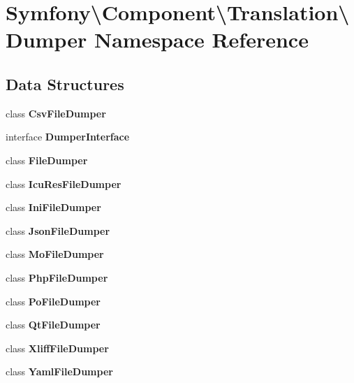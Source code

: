 \section{Symfony\textbackslash{}Component\textbackslash{}Translation\textbackslash{}Dumper Namespace Reference}
\label{namespace_symfony_1_1_component_1_1_translation_1_1_dumper}
\subsection*{Data Structures}
\begin{DoxyCompactItemize}
\item 
class {\bf Csv\+File\+Dumper}
\item 
interface {\bf Dumper\+Interface}
\item 
class {\bf File\+Dumper}
\item 
class {\bf Icu\+Res\+File\+Dumper}
\item 
class {\bf Ini\+File\+Dumper}
\item 
class {\bf Json\+File\+Dumper}
\item 
class {\bf Mo\+File\+Dumper}
\item 
class {\bf Php\+File\+Dumper}
\item 
class {\bf Po\+File\+Dumper}
\item 
class {\bf Qt\+File\+Dumper}
\item 
class {\bf Xliff\+File\+Dumper}
\item 
class {\bf Yaml\+File\+Dumper}
\end{DoxyCompactItemize}
